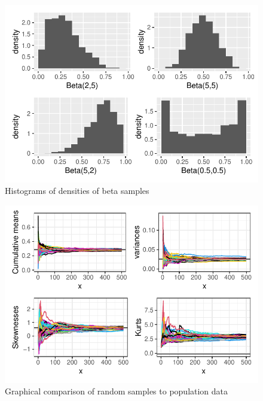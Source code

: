 \documentclass{article}\usepackage[]{graphicx}\usepackage[]{xcolor}
\makeatletter
\def\maxwidth{ %
  \ifdim\Gin@nat@width>\linewidth
    \linewidth
  \else
    \Gin@nat@width
  \fi
}
\newenvironment{knitrout}{}{} %
\makeatother
\begin{document}
\begin{multicols}{2}
\begin{figure}[H]
\begin{center}
\begin{knitrout}
\color{fgcolor}
\includegraphics[width=\maxwidth]{figure/unnamed-chunk-6-1} 
\end{knitrout}
\caption{Histograms of densities of beta samples}
\label{plot2} 
\end{center}
\end{figure}



\begin{figure}[H]
\begin{center}
\begin{knitrout}
\color{fgcolor}
\includegraphics[width=\maxwidth]{figure/unnamed-chunk-7-1} 
\end{knitrout}
\caption{Graphical comparison of random samples to population data}
\label{plot3} 
\end{center}
\end{figure}



\end{multicols}
\end{document}
